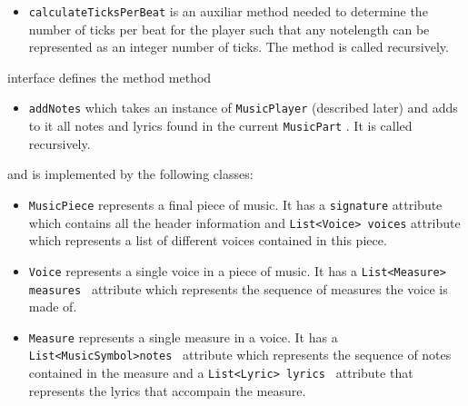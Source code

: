 \documentclass[12pt]{book}
\begin{document}
\begin{itemize} 

\item { \tt calculateTicksPerBeat} is an auxiliar method needed to determine the number of ticks per beat for the player such that any notelength can be represented as an integer number of ticks. The method is called recursively.
\end{itemize}


\noindent\makebox[\linewidth]{\rule{\textwidth}{0.4pt}}

\smallskip
{} interface  defines the method method
\begin{itemize} 
\item { \tt addNotes} which takes an instance of  {\tt MusicPlayer} (described later) and adds to it all notes and lyrics found in the current {\tt MusicPart}  . It is called recursively.
\end{itemize}

\noindent and is implemented by the following classes:
\begin{itemize} 
\item { \tt MusicPiece} represents a final piece of music.   It has a {\tt signature} attribute which contains all the header information and {\tt List<Voice> voices} attribute which represents a list of different voices contained in this piece.
\item {\tt Voice}  represents a single voice in a piece of music. It has a {\tt List<Measure> measures } attribute which represents the sequence of measures the voice is made of.
\item {\tt Measure}  represents a single measure in a voice. It has a {\tt List<MusicSymbol>notes } attribute which represents the sequence of notes contained in the measure and a  {\tt List<Lyric> lyrics } attribute that represents the lyrics that accompain the measure.
\end{itemize}
\noindent\makebox[\linewidth]{\rule{\textwidth}{0.4pt}}
\end{document}
